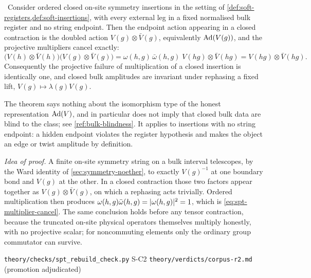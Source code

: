 \begin{theorem}\label{thm:multiplier-cancellation}
\statusProved\ Consider ordered closed on-site symmetry insertions in the
setting of \cref{def:soft-registers,def:soft-insertions}, with every external
leg in a fixed normalised bulk register and no string endpoint. Then the
endpoint action appearing in a closed contraction is the doubled action
$V(g)\otimes\bar V(g)$, equivalently $\operatorname{Ad}(V(g))$, and the projective
multipliers cancel exactly:
\begin{equation}
  \bigl(V(h)\otimes\bar V(h)\bigr)\bigl(V(g)\otimes\bar V(g)\bigr)
  =\omega(h,g)\,\bar\omega(h,g)\;V(hg)\otimes\bar V(hg)
  = V(hg)\otimes\bar V(hg).
  \label{eq:spt-multiplier-cancel}
\end{equation}
Consequently the projective failure of multiplication of a closed insertion is
identically one, and closed bulk amplitudes are invariant under rephasing a
fixed lift, $V(g)\mapsto\lambda(g)V(g)$.
\end{theorem}

\begin{scope}
The theorem says nothing about the isomorphism type of the honest
representation $\operatorname{Ad}(V)$, and in particular does not imply that closed bulk
data are blind to the class; see \cref{ref:bulk-blindness}. It applies to
insertions with no string endpoint: a hidden endpoint violates the register
hypothesis and makes the object an edge or twist amplitude by definition.
\end{scope}

\emph{Idea of proof.} A finite on-site symmetry string on a bulk interval
telescopes, by the Ward identity of \cref{sec:symmetry-noether}, to exactly
$V(g)^{-1}$ at one boundary bond and $V(g)$ at the other. In a closed
contraction those two factors appear together as $V(g)\otimes\bar V(g)$, on
which a rephasing acts trivially. Ordered multiplication then produces
$\omega(h,g)\bar\omega(h,g)=\lvert \omega(h,g)\rvert^{2}=1$, which is
\eqref{eq:spt-multiplier-cancel}. The same conclusion holds before any tensor
contraction, because the truncated on-site physical operators themselves
multiply honestly, with no projective scalar; for noncommuting elements only
the ordinary group commutator can survive.

%
{\texttt{theory/checks/spt\_rebuild\_check.py} S-C2}%
{\texttt{theory/verdicts/corpus-r2.md} (promotion adjudicated)}

